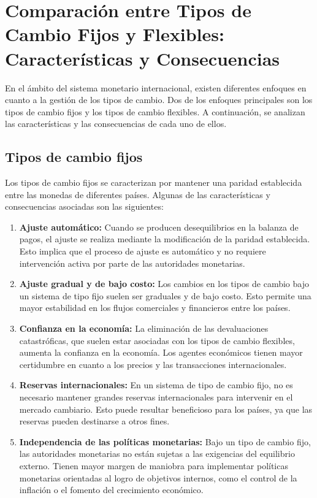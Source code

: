 \documentclass[
  letterpaper,
  DIV=11,
  numbers=noendperiod]{scrartcl}
\begin{document}
\hypertarget{comparaciuxf3n-entre-tipos-de-cambio-fijos-y-flexibles-caracteruxedsticas-y-consecuencias}{%
\section{Comparación entre Tipos de Cambio Fijos y Flexibles:
Características y
Consecuencias}\label{comparaciuxf3n-entre-tipos-de-cambio-fijos-y-flexibles-caracteruxedsticas-y-consecuencias}}

En el ámbito del sistema monetario internacional, existen diferentes
enfoques en cuanto a la gestión de los tipos de cambio. Dos de los
enfoques principales son los tipos de cambio fijos y los tipos de cambio
flexibles. A continuación, se analizan las características y las
consecuencias de cada uno de ellos.

\hypertarget{tipos-de-cambio-fijos}{%
\subsection{Tipos de cambio fijos}\label{tipos-de-cambio-fijos}}

Los tipos de cambio fijos se caracterizan por mantener una paridad
establecida entre las monedas de diferentes países. Algunas de las
características y consecuencias asociadas son las siguientes:

\begin{enumerate}
\def\labelenumi{\arabic{enumi}.}
\item
  \textbf{Ajuste automático:} Cuando se producen desequilibrios en la
  balanza de pagos, el ajuste se realiza mediante la modificación de la
  paridad establecida. Esto implica que el proceso de ajuste es
  automático y no requiere intervención activa por parte de las
  autoridades monetarias.
\item
  \textbf{Ajuste gradual y de bajo costo:} Los cambios en los tipos de
  cambio bajo un sistema de tipo fijo suelen ser graduales y de bajo
  costo. Esto permite una mayor estabilidad en los flujos comerciales y
  financieros entre los países.
\item
  \textbf{Confianza en la economía:} La eliminación de las devaluaciones
  catastróficas, que suelen estar asociadas con los tipos de cambio
  flexibles, aumenta la confianza en la economía. Los agentes económicos
  tienen mayor certidumbre en cuanto a los precios y las transacciones
  internacionales.
\item
  \textbf{Reservas internacionales:} En un sistema de tipo de cambio
  fijo, no es necesario mantener grandes reservas internacionales para
  intervenir en el mercado cambiario. Esto puede resultar beneficioso
  para los países, ya que las reservas pueden destinarse a otros fines.
\item
  \textbf{Independencia de las políticas monetarias:} Bajo un tipo de
  cambio fijo, las autoridades monetarias no están sujetas a las
  exigencias del equilibrio externo. Tienen mayor margen de maniobra
  para implementar políticas monetarias orientadas al logro de objetivos
  internos, como el control de la inflación o el fomento del crecimiento
  económico.
\end{enumerate}
\end{document}
